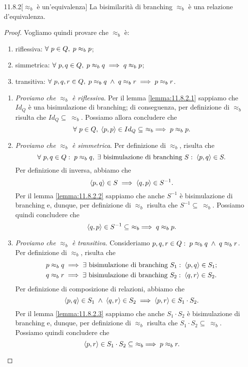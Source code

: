 \begin{customthm}{11.8.2}[$\approx_b$ è un'equivalenza]
\label{th:11.8.2}
La bisimilarità di branching $\approx_b$ è una relazione d'equivalenza.
\end{customthm}
\begin{proof}
Vogliamo quindi provare che $\approx_b$ è:
\begin{enumerate}
\item riflessiva: 
	$\forall\ p \in Q ,\; p \approx_b p$; 
\item simmetrica:
	$\forall\ p,q \in Q ,\;
		p \approx_b q
		\implies q \approx_b p$;
\item transitiva:
	$\forall\ p,q,r \in Q ,\;
		p \approx_b q \; \land \; q \approx_b r
		\implies p \approx_b r$.
\end{enumerate}
\begin{enumerate}[leftmargin=*]
\item \textit{Proviamo che $\approx_b$ è riflessiva}. Per il lemma \ref{lemma:11.8.2.1} sappiamo che $Id_Q$ è una bisimulazione di branching; di conseguenza, per definizione di $\approx_b$ risulta che $Id_Q \subseteq\ \approx_b$. Possiamo allora concludere che \[
	\forall\ p \in Q ,\;
	\langle p, p \rangle \in Id_Q \subseteq\ \approx_b
	\implies p \approx_b p.
\]
\item \textit{Proviamo che $\approx_b$ è simmetrica}. Per definizione di $\approx_b$, risulta che \[
	\forall\ p,q \in Q :\; p \approx_b q ,\;
		\exists\ \text{bisimulazione di branching}\ S :\; \langle p,q \rangle \in S.
\]
Per definizione di inversa, abbiamo che \[
	\langle p,q \rangle \in S \implies \langle q,p \rangle \in S^{-1}.
\]
Per il lemma \ref{lemma:11.8.2.2} sappiamo che anche $S^{-1}$ è bisimulazione di branching e, dunque, per definizione di $\approx_b$ risulta che $S^{-1} \subseteq\ \approx_b$. Possiamo quindi concludere che \[
	\langle q,p \rangle \in S^{-1} \subseteq\ \approx_b \implies q \approx_b p.
\]
\item \textit{Proviamo che $\approx_b$ è transitiva}. Consideriamo $p,q,r \in Q :\; p \approx_b q \; \land \; q \approx_b r$. Per definizione di $\approx_b$, risulta che
\begin{align*}
	&p \approx_b q \implies 
		\exists\ \text{bisimulazione di branching}\ S_1 :\; \langle p,q \rangle \in S_1; \\
	&q \approx_b r \implies 
		\exists\ \text{bisimulazione di branching}\ S_2 :\; \langle q,r \rangle \in S_2.
\end{align*}
Per definizione di composizione di relazioni, abbiamo che \[
	\langle p,q \rangle \in S_1 \; \land \; \langle q,r \rangle \in S_2
	\implies \langle p,r \rangle \in S_1 \cdot S_2.
\]
Per il lemma \ref{lemma:11.8.2.3} sappiamo che anche $S_1 \cdot S_2$ è bisimulazione di branching e, dunque, per definizione di $\approx_b$ risulta che $S_1 \cdot S_2 \subseteq\ \approx_b$. Possiamo quindi concludere che \[
	\langle p,r \rangle \in S_1 \cdot S_2 \subseteq\ \approx_b 
	\implies p \approx_b r.
\]
\end{enumerate}
\end{proof}